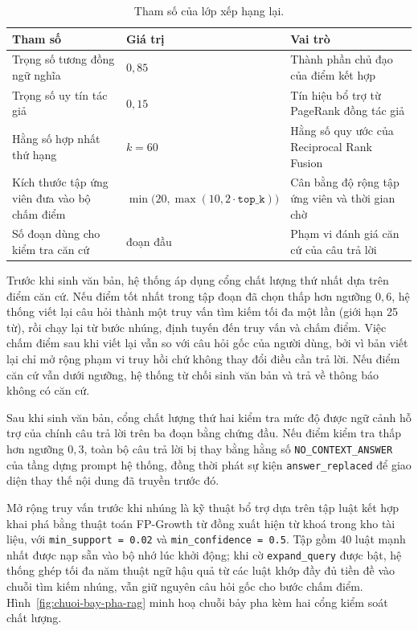 \begin{table}[htbp]
    \centering
    \caption{Tham số của lớp xếp hạng lại.}
    \label{tab:tham-so-xep-hang-lai}
    \small
    \begin{tabularx}{\textwidth}{@{}>{\raggedright\arraybackslash}p{4.6cm}>{\raggedright\arraybackslash}p{3.9cm}>{\raggedright\arraybackslash}X@{}}
        \toprule
        \textbf{Tham số} & \textbf{Giá trị} & \textbf{Vai trò} \\
        \midrule
        Trọng số tương đồng ngữ nghĩa & $0{,}85$ & Thành phần chủ đạo của điểm kết hợp \\
        Trọng số uy tín tác giả & $0{,}15$ & Tín hiệu bổ trợ từ PageRank đồng tác giả \\
        Hằng số hợp nhất thứ hạng & $k = 60$ & Hằng số quy ước của Reciprocal Rank Fusion \\
        Kích thước tập ứng viên đưa vào bộ chấm điểm & $\min\bigl(20, \max(10, 2 \cdot \texttt{top\_k})\bigr)$ & Cân bằng độ rộng tập ứng viên và thời gian chờ \\
        Số đoạn dùng cho kiểm tra căn cứ & 3 đoạn đầu & Phạm vi đánh giá căn cứ của câu trả lời \\
        \bottomrule
    \end{tabularx}
\end{table}

Trước khi sinh văn bản, hệ thống áp dụng cổng chất lượng thứ nhất dựa trên điểm căn cứ. Nếu điểm tốt nhất trong tập đoạn đã chọn thấp hơn ngưỡng $0{,}6$, hệ thống viết lại câu hỏi thành một truy vấn tìm kiếm tối đa một lần (giới hạn 25 từ), rồi chạy lại từ bước nhúng, định tuyến đến truy vấn và chấm điểm. Việc chấm điểm sau khi viết lại vẫn so với câu hỏi gốc của người dùng, bởi vì bản viết lại chỉ mở rộng phạm vi truy hồi chứ không thay đổi điều cần trả lời. Nếu điểm căn cứ vẫn dưới ngưỡng, hệ thống từ chối sinh văn bản và trả về thông báo không có căn cứ.

Sau khi sinh văn bản, cổng chất lượng thứ hai kiểm tra mức độ được ngữ cảnh hỗ trợ của chính câu trả lời trên ba đoạn bằng chứng đầu. Nếu điểm kiểm tra thấp hơn ngưỡng $0{,}3$, toàn bộ câu trả lời bị thay bằng hằng số \texttt{NO\_CONTEXT\_ANSWER} của tầng dựng prompt hệ thống, đồng thời phát sự kiện \texttt{answer\_replaced} để giao diện thay thế nội dung đã truyền trước đó.

Mở rộng truy vấn trước khi nhúng là kỹ thuật bổ trợ dựa trên tập luật kết hợp khai phá bằng thuật toán FP-Growth từ đồng xuất hiện từ khoá trong kho tài liệu, với \texttt{min\_support = 0.02} và \texttt{min\_confidence = 0.5}. Tập gồm 40 luật mạnh nhất được nạp sẵn vào bộ nhớ lúc khởi động; khi cờ \texttt{expand\_query} được bật, hệ thống ghép tối đa năm thuật ngữ hậu quả từ các luật khớp đầy đủ tiền đề vào chuỗi tìm kiếm nhúng, vẫn giữ nguyên câu hỏi gốc cho bước chấm điểm. Hình~\ref{fig:chuoi-bay-pha-rag} minh hoạ chuỗi bảy pha kèm hai cổng kiểm soát chất lượng.

